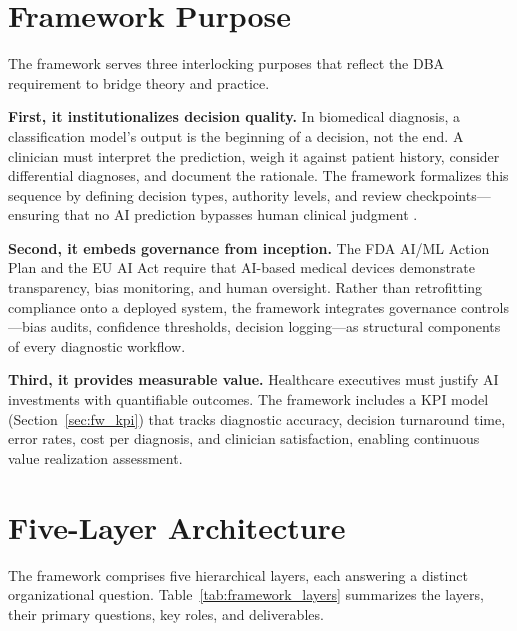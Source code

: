\section{Framework Purpose}
\label{sec:fw_purpose}

The framework serves three interlocking purposes that reflect the DBA requirement to bridge theory and practice.

\textbf{First, it institutionalizes decision quality.} In biomedical diagnosis, a classification model's output is the beginning of a decision, not the end. A clinician must interpret the prediction, weigh it against patient history, consider differential diagnoses, and document the rationale. The framework formalizes this sequence by defining decision types, authority levels, and review checkpoints---ensuring that no AI prediction bypasses human clinical judgment \citep{topol2019deep, wiens2019nofreelunch}.

\textbf{Second, it embeds governance from inception.} The FDA AI/ML Action Plan \citep{fda2021aiml} and the EU AI Act \citep{eu2021aiact} require that AI-based medical devices demonstrate transparency, bias monitoring, and human oversight. Rather than retrofitting compliance onto a deployed system, the framework integrates governance controls---bias audits, confidence thresholds, decision logging---as structural components of every diagnostic workflow.

\textbf{Third, it provides measurable value.} Healthcare executives must justify AI investments with quantifiable outcomes. The framework includes a KPI model (Section~\ref{sec:fw_kpi}) that tracks diagnostic accuracy, decision turnaround time, error rates, cost per diagnosis, and clinician satisfaction, enabling continuous value realization assessment.

\section{Five-Layer Architecture}
\label{sec:fw_architecture}

The framework comprises five hierarchical layers, each answering a distinct organizational question. Table~\ref{tab:framework_layers} summarizes the layers, their primary questions, key roles, and deliverables.

